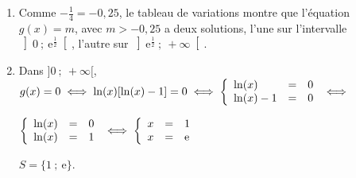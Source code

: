 \begin{enumerate}
\item 
Comme $- \frac{1}{4} = - 0,25$, le tableau de variations montre que l'équation $g(x) = m$, avec $m > -0,25$ a deux solutions, l'une sur l'intervalle $\left]0~;~\text{e}^{\frac{1}{2}}\right[$, l'autre sur $\left]\text{e}^{\frac{1}{2}}~;~+ \infty\right[$.
\item 
Dans $]0~;~+ \infty[$, \, $g(x) = 0 \iff \ln (x) [\ln (x) - 1] = 0 \iff \left\{\begin{array}{l c l}
\ln (x)&=&0\\
\ln (x) - 1&=&0
\end{array}\right. \iff $

$\left\{\begin{array}{l c l}
\ln (x)&=&0\\
\ln (x) &=&1
\end{array}\right. \iff \left\{\begin{array}{l c l}
x&=&1\\
x &=&\text{e}
\end{array}\right.$

$S = \{1~;~\text{e}\}$.
\end{enumerate}
